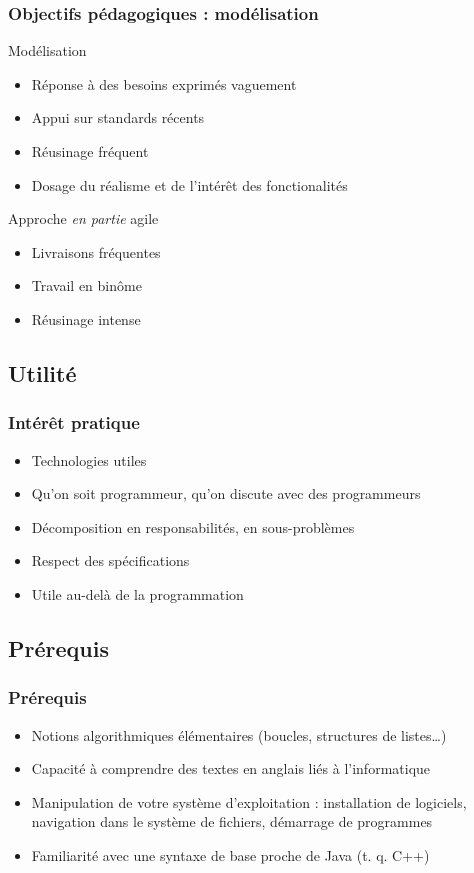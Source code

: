 \documentclass[english, french]{beamer}
\begin{document}
\begin{frame}
	\frametitle{Objectifs pédagogiques : modélisation}
	\begin{block}{Modélisation}
		\begin{itemize}
		\item Réponse à des besoins exprimés vaguement
		\item Appui sur standards récents
		\item Réusinage fréquent
		\item Dosage du réalisme et de l’intérêt des fonctionalités
		\end{itemize}
	\end{block}
	Approche \emph{en partie} agile
	\begin{itemize}
		\item Livraisons fréquentes
		\item Travail en binôme
		\item Réusinage intense
	\end{itemize}
\end{frame}

\subsection{Utilité}
\begin{frame}
	\frametitle{Intérêt pratique}
	\begin{itemize}
		\item Technologies utiles
		\item Qu’on soit programmeur, qu’on discute avec des programmeurs
		\item Décomposition en responsabilités, en sous-problèmes
		\item Respect des spécifications
		\item Utile au-delà de la programmation
	\end{itemize}
\end{frame}

\subsection{Prérequis}
\begin{frame}
	\frametitle{Prérequis}
	\begin{itemize}
		\item Notions algorithmiques élémentaires (boucles, structures de listes…)
		\item Capacité à comprendre des textes en anglais liés à l’informatique
		\item Manipulation de votre système d’exploitation : installation de logiciels, navigation dans le système de fichiers, démarrage de programmes
		\item Familiarité avec une syntaxe de base proche de Java (t. q. C++)
	\end{itemize}
\end{frame}
\end{document}

